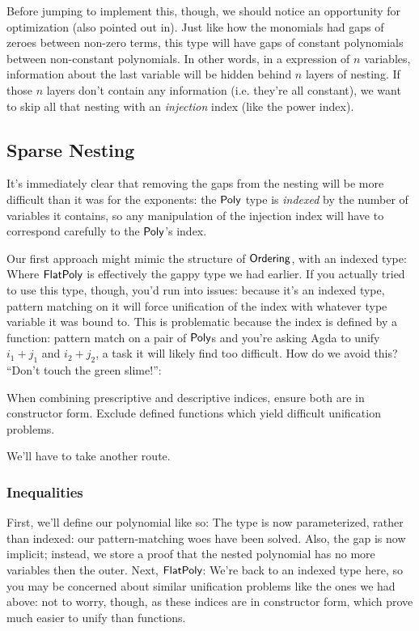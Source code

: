 \documentclass[draft, twocolumn]{article}
\theoremstyle{definition}
\theoremstyle{remark}
\begin{document}
Before jumping to implement this, though, we should notice an opportunity for
optimization (also pointed out in\cite{hutchison_proving_2005}). Just like how
the monomials had gaps of zeroes between non-zero terms, this type will have
gaps of constant polynomials between non-constant polynomials. In other words,
in a expression of \(n\) variables, information about the last variable will be
hidden behind \(n\) layers of nesting. If those \(n\) layers don't contain any
information (i.e. they're all constant), we want to skip all that nesting with
an \emph{injection} index (like the power index).
\subsection{Sparse Nesting}
It's immediately clear that removing the gaps from the nesting will be more
difficult than it was for the exponents: the \(\AgdaDatatype{Poly}\) type is
\emph{indexed} by the number of variables it contains, so any manipulation of
the injection index will have to correspond carefully to the
\(\AgdaDatatype{Poly}\)'s index.

Our first approach might mimic the structure of \(\AgdaDatatype{Ordering}\),
with an indexed type:
Where \(\AgdaDatatype{FlatPoly}\) is effectively the gappy type we had earlier.
If you actually tried to use this type, though, you'd run into issues: because
it's an indexed type, pattern matching on it will force unification of the index
with whatever type variable it was bound to. This is problematic because the
index is defined by a function: pattern match on a pair of
\(\AgdaDatatype{Poly}\)s and you're asking Agda to unify \(i_1 + j_1\) and
\(i_2 + j_2\), a task it will likely find too difficult. How do we avoid this?
``Don't touch the green slime!''\cite{mcbride_polynomial_2018}:
\begin{displayquote}
  When combining prescriptive and descriptive indices, ensure both are in
  constructor form. Exclude defined functions which yield difficult unification
  problems.
\end{displayquote}
We'll have to take another route.
\subsubsection{Inequalities}
First, we'll define our polynomial like so:
The type is now parameterized, rather than indexed: our pattern-matching woes
have been solved. Also, the gap is now implicit; instead, we store a proof that
the nested polynomial has no more variables then the outer. Next,
\(\AgdaDatatype{FlatPoly}\):
We're back to an indexed type here, so you may be concerned about similar
unification problems like the ones we had above: not to worry, though, as these
indices are in constructor form, which prove much easier to unify than
functions.
\end{document}
